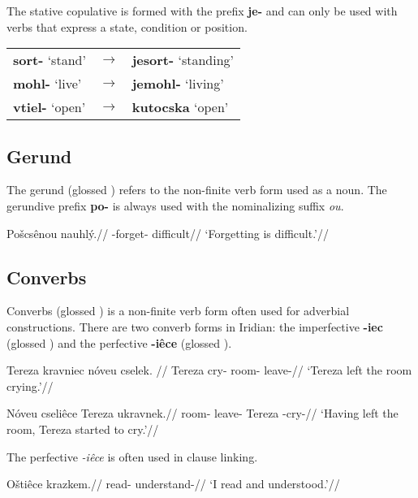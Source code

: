 \par The stative copulative is formed with the prefix \textbf{je-} and can only be used with verbs that express a state, condition or position.

\begin{table}[h!]
	\small\centering
	\begin{tabularx}{0.8\textwidth}{YMY}
		\textbf{sort-} `stand' &$\rightarrow$&\textbf{jesort-} `standing'\\
		\textbf{mohl-} `live'&$\rightarrow$&\textbf{jemohl-} `living'\\
		\textbf{vtiel-} `open'&$\rightarrow$&\textbf{kutocska} `open'\\
	\end{tabularx}
\end{table}


\subsection{Gerund}
\par The gerund (glossed ) refers to the non-finite verb form used as a noun. The gerundive prefix \textbf{po-} is always used with the nominalizing suffix \textit{ou}.

\pex
\begingl
\gla Po\v{s}csênou nauhlý.//
\glb {}-forget- difficult//
\glft `Forgetting is difficult.'//
\endgl
\xe

\subsection{Converbs}
Converbs (glossed ) is a non-finite verb form often used for adverbial constructions. There are two converb forms in Iridian: the imperfective \textbf{-iec} (glossed ) and the perfective \textbf{-iêce} (glossed ).

\pex
\begingl
\gla Tereza kravniec nóveu cselek. //
\glb Tereza cry- room- leave-//
\glft `Tereza left the room crying.'//
\endgl
\xe

\pex
\begingl
\gla Nóveu cseliêce Tereza ukravnek.//
\glb room- leave- Tereza -cry-//
\glft `Having left the room, Tereza started to cry.'//
\endgl
\xe

The perfective \textit{-iêce} is often used in clause linking.

\pex
\begingl
\gla O\v{s}tiêce krazkem.//
\glb read- understand-//
\glft `I read and understood.'//
\endgl
\xe

